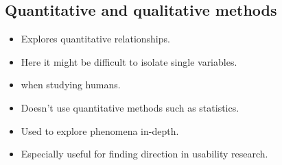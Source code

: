 \subsection{Quantitative and qualitative methods}

\begin{frame}
  \begin{definition}
    \begin{itemize}
      \item Explores quantitative relationships.
      \item Here it might be difficult to isolate single variables.
      \item \Eg when studying humans.
    \end{itemize}
  \end{definition}

  \begin{definition}
    \begin{itemize}
      \item Doesn't use quantitative methods such as statistics.
      \item Used to explore phenomena in-depth.
      \item Especially useful for finding direction in usability research.
    \end{itemize}
  \end{definition}
\end{frame}




\begin{frame}[allowframebreaks]
  \small
  \printbibliography
\end{frame}

